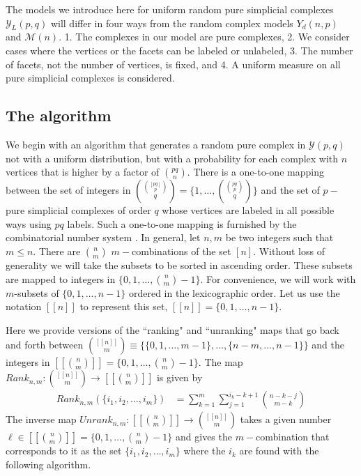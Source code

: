 \documentclass[12pt]{article}
\theoremstyle{plain}
\theoremstyle{definition}
\theoremstyle{remark}
\newcommand{\setn}[1]{[[{#1}]]}
\begin{document}
The models we introduce here for uniform random pure simplicial complexes $\mathcal{Y}_L(p,q)$ will differ in four ways from the random complex models $Y_d(n,p)$ and $\mathcal{M}(n)$. 1. The complexes in our model are pure complexes, 2. We consider cases where the vertices or the facets can be labeled or unlabeled, 3. The number of facets, not the number of vertices, is fixed, and 4. A uniform measure on all pure simplicial complexes is considered. 
 
\subsection{The algorithm}

We begin with an algorithm that generates a random pure complex in $\mathcal{Y}(p,q)$ not with a uniform distribution, but with a probability for each complex with $n$ vertices that is higher by a factor of $\binom{pq}{n}$. There is a one-to-one mapping between the set of integers in $\binom{\binom{[pq]}{p}}{q}=\{1,\dots,\binom{\binom{pq}{p}}{q}\}$ and the set of $p-$pure simplicial complexes of order $q$ whose vertices are labeled in all possible ways using $pq$ labels. Such a one-to-one mapping is furnished by the combinatorial number system \cite{lehmer1964machine, kreher1999combinatorial, mccaffrey2004generating, donnot2020unranking}. In general, let $n,m$ be two integers such that $m\le n$. There are $\binom{n}{m}$ $m-$combinations of the  set $[n]$. Without loss of generality we will take the subsets to be sorted in ascending order. These subsets are mapped to integers in $\{0,1,\dots,\binom{n}{m}-1\}$. For convenience, we will work with $m$-subsets of $\{0,1,\dots,n-1\}$ ordered in the lexicographic order. Let us use the notation  $\setn{n}$ to represent this set, $\setn{n}=\{0,1,\dots,n-1\}$. %

Here we provide versions of the ``ranking" and ``unranking" maps that go back and forth between $\binom{\setn{n}}{m}\equiv\{\{0,1,\dots,m-1\},\dots,\{n-m,\dots,n-1\}\}$ and the integers in $\setn{\binom{n}{m}}=\{0,1,\dots,\binom{n}{m}-1\}$. The map $Rank_{n,m}:\binom{\setn{n}}{m}\rightarrow \setn{\binom{n}{m}}$ is given by 
	\begin{align}
    \label{eq:rank}
	    Rank_{n,m}(\{i_1,i_2,\dots,i_m\})
	    &=\sum_{k=1}^{m}\sum_{j=1}^{i_k-k+1}\binom{n-k-j}{m-k}
	\end{align}
The inverse map $Unrank_{n,m}:\setn{\binom{n}{m}}\rightarrow \binom{\setn{n}}{m}$ takes a given number $\ell\in\setn{\binom{n}{m}}=\{0,1,\dots,\binom{n}{m}-1\}$ and gives the $m-$combination that corresponds to it as the set $\{i_1,i_2,\dots,i_m\}$ where the $i_k$ are found with the following algorithm. 
\end{document}
